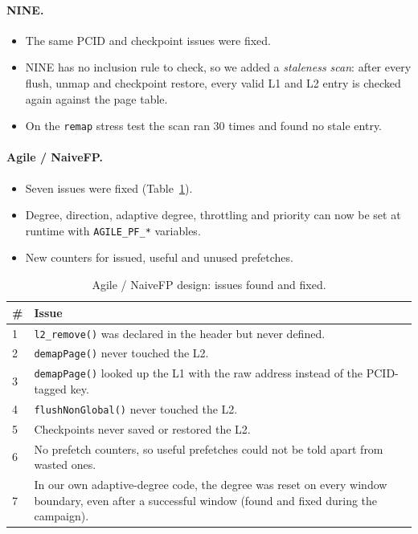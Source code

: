 \paragraph{NINE.}
\begin{itemize}
    \item The same PCID and checkpoint issues were fixed.
    \item NINE has no inclusion rule to check, so we added a \emph{staleness scan}: after every flush, unmap and checkpoint restore, every valid L1 and L2 entry is checked again against the page table.
    \item On the \texttt{remap} stress test the scan ran 30 times and found no stale entry.
\end{itemize}

\paragraph{Agile / NaiveFP.}
\begin{itemize}
    \item Seven issues were fixed (Table~\ref{tab:agile_bugs}).
    \item Degree, direction, adaptive degree, throttling and priority can now be set at runtime with \texttt{AGILE\_PF\_*} variables.
    \item New counters for issued, useful and unused prefetches.
\end{itemize}

\begin{table}[htbp]
\centering
\small
\caption{Agile / NaiveFP design: issues found and fixed.}
\label{tab:agile_bugs}
\begin{tabularx}{\textwidth}{l X}
\toprule
\textbf{\#} & \textbf{Issue} \\
\midrule
1 & \texttt{l2\_remove()} was declared in the header but never defined. \\
2 & \texttt{demapPage()} never touched the L2. \\
3 & \texttt{demapPage()} looked up the L1 with the raw address instead of the PCID-tagged key. \\
4 & \texttt{flushNonGlobal()} never touched the L2. \\
5 & Checkpoints never saved or restored the L2. \\
6 & No prefetch counters, so useful prefetches could not be told apart from wasted ones. \\
7 & In our own adaptive-degree code, the degree was reset on every window boundary, even after a successful window (found and fixed during the campaign). \\
\bottomrule
\end{tabularx}
\end{table}

